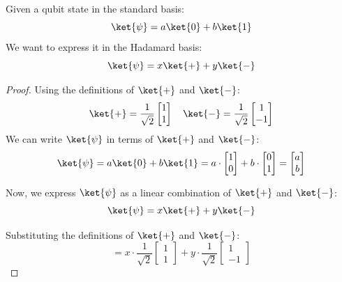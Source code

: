 \begin{examplebox}
    Given a qubit state in the standard basis:
    \begin{equation*}
        \ket{\psi} = a \ket{0} + b \ket{1}
    \end{equation*}
    We want to express it in the Hadamard basis:
    \begin{equation*}
        \ket{\psi} = x \ket{+} + y \ket{-}
    \end{equation*}

    \begin{proof}
        Using the definitions of $\ket{+}$ and $\ket{-}$:
        \begin{equation*}
            \ket{+} = \frac{1}{\sqrt{2}}
            \begin{bmatrix}
                1 \\ 1
            \end{bmatrix}
            \quad
            \ket{-} = \frac{1}{\sqrt{2}}
            \begin{bmatrix}
                1 \\ -1
            \end{bmatrix}
        \end{equation*}
        We can write $\ket{\psi}$ in terms of $\ket{+}$ and $\ket{-}$:
        \begin{equation*}
            \ket{\psi} = a \ket{0} + b \ket{1}
            = a \cdot
            \begin{bmatrix}
                1 \\ 0
            \end{bmatrix}
            + b \cdot
            \begin{bmatrix}
                0 \\ 1
            \end{bmatrix}
            =
            \begin{bmatrix}
                a \\ b
            \end{bmatrix}
        \end{equation*}
    
        Now, we express $\ket{\psi}$ as a linear combination of $\ket{+}$ and $\ket{-}$:
        \begin{equation*}
            \ket{\psi} = x \ket{+} + y \ket{-}
        \end{equation*}

        Substituting the definitions of $\ket{+}$ and $\ket{-}$:
        \begin{equation*}
            = x \cdot \frac{1}{\sqrt{2}}
            \begin{bmatrix}
                1 \\ 1
            \end{bmatrix}
            + y \cdot \frac{1}{\sqrt{2}}
            \begin{bmatrix}
                1 \\ -1
            \end{bmatrix}
        \end{equation*}


\end{proof}
\end{examplebox}
